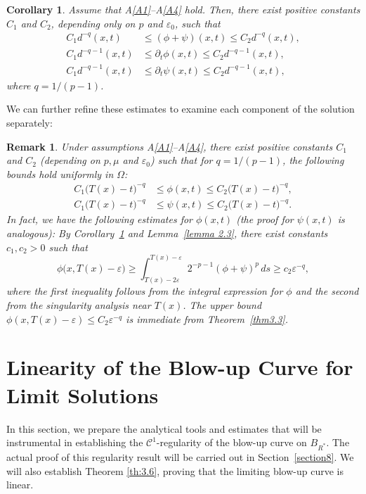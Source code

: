 \documentclass[
  sn-mathphys-num,
  colorlinks,
  linkcolor=darkmagenta,
  citecolor=rufous,
  urlcolor=zaffre,
  hypertexnames=false
]{sn-jnl}
\numberwithin{equation}{section}
\newtheorem{remark}[theorem]{Remark}%
\newtheorem{corollary}[theorem]{Corollary}
\begin{document}
\begin{corollary}\label{cor:3.5}
Assume that A\ref{A1}--A\ref{A4} hold. Then, there exist positive constants $C_1$ and $C_2$, depending only on $p$ and $\varepsilon_0$, such that
\begin{align}
C_1d^{-q}(x,t) &\le (\phi+\psi)(x,t) \le C_2d^{-q}(x,t), \label{eq:3.18}\\
C_1d^{-q-1}(x,t) &\le \partial_t\phi(x,t) \le C_2d^{-q-1}(x,t), \label{eq:3.19}\\
C_1d^{-q-1}(x,t) &\le \partial_t\psi(x,t) \le C_2d^{-q-1}(x,t), \label{eq:3.20}
\end{align}
where $q=1/(p-1)$.
\end{corollary}

We can further refine these estimates to examine each component of the solution separately:

\begin{remark}\label{lem:3.6}
\rm  Under assumptions A\ref{A1}--A\ref{A4}, there exist positive constants $C_1$ and $C_2$ (depending on $p,\mu $ and $\varepsilon_0$) such that for $q=1/(p-1)$, the following bounds hold uniformly in $\Omega$:
\begin{align}
C_1\bigl(T(x)-t\bigr)^{-q} &\le \phi(x,t) \le C_2\bigl(T(x)-t\bigr)^{-q}, \label{eq:3.21R}\\
C_1\bigl(T(x)-t\bigr)^{-q} &\le \psi(x,t) \le C_2\bigl(T(x)-t\bigr)^{-q}. \label{eq:3.22R}
\end{align}
In fact, we have the following estimates for $\phi(x,t)$ (the proof for $\psi(x,t)$ is analogous):  
By Corollary~\ref{cor:3.5} and Lemma~\ref{lemma 2.3}, there exist constants $c_1, c_2 > 0$ such that  
$$
\phi\bigl(x,T(x)-\varepsilon\bigr) \ge \int_{T(x)-2\varepsilon}^{T(x)-\varepsilon} 2^{-p-1}(\phi+\psi)^p \, ds \ge c_2 \varepsilon^{-q},
$$  
where the first inequality follows from the integral expression for $\phi$ and the second from the singularity analysis near $T(x)$. The upper bound $\phi(x,T(x)-\varepsilon) \leq C_2 \varepsilon^{-q}$ is immediate from Theorem~\ref{thm3.3}.
\end{remark}

\section{Linearity of the Blow-up Curve for Limit Solutions}\label{sec7}
In this section, we prepare the analytical tools and estimates that will be instrumental in establishing the $\mathcal{C}^1$-regularity of the blow-up curve  on $B_{R^*}$. The actual proof of this regularity result will be carried out in Section~\ref{section8}.
We will also establish Theorem \ref{th:3.6}, proving that the limiting blow-up curve is linear.
\end{document}
